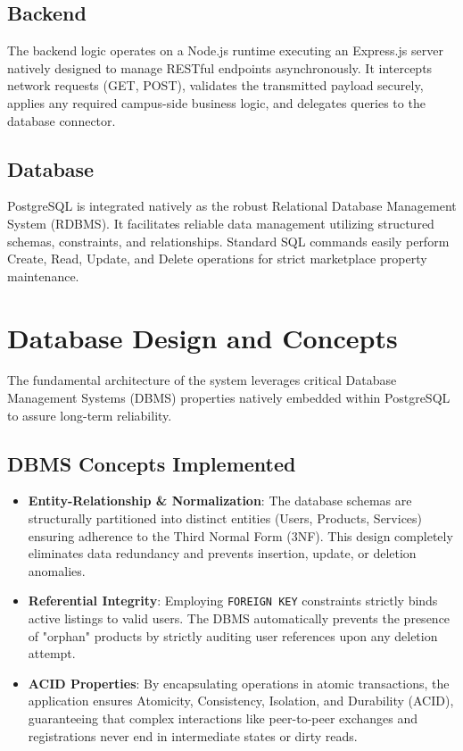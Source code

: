 \documentclass[a4paper,12pt]{report}
\begin{document}
\subsection{Backend}
The backend logic operates on a Node.js runtime executing an Express.js server natively designed to manage RESTful endpoints asynchronously. It intercepts network requests (GET, POST), validates the transmitted payload securely, applies any required campus-side business logic, and delegates queries to the database connector. 

\subsection{Database}
PostgreSQL is integrated natively as the robust Relational Database Management System (RDBMS). It facilitates reliable data management utilizing structured schemas, constraints, and relationships. Standard SQL commands easily perform Create, Read, Update, and Delete operations for strict marketplace property maintenance.

\section{Database Design and Concepts}

The fundamental architecture of the system leverages critical Database Management Systems (DBMS) properties natively embedded within PostgreSQL to assure long-term reliability.

\subsection{DBMS Concepts Implemented}

\begin{itemize}
\item \textbf{Entity-Relationship \& Normalization}: The database schemas are structurally partitioned into distinct entities (Users, Products, Services) ensuring adherence to the Third Normal Form (3NF). This design completely eliminates data redundancy and prevents insertion, update, or deletion anomalies.
\item \textbf{Referential Integrity}: Employing \texttt{FOREIGN KEY} constraints strictly binds active listings to valid users. The DBMS automatically prevents the presence of "orphan" products by strictly auditing user references upon any deletion attempt.
\item \textbf{ACID Properties}: By encapsulating operations in atomic transactions, the application ensures Atomicity, Consistency, Isolation, and Durability (ACID), guaranteeing that complex interactions like peer-to-peer exchanges and registrations never end in intermediate states or dirty reads.
\end{itemize}
\end{document}

